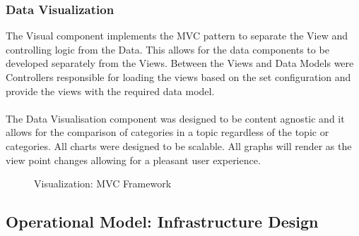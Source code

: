 \documentclass[12pt]{article} %
\begin{document}
	\subsubsection{Data Visualization}
	
	The Visual component implements the MVC pattern to separate the View and controlling logic from the Data. This allows for the data components to be developed separately from the Views. Between the Views and Data Models were Controllers responsible for  loading the views based on the set configuration and provide the views with the required data model.\\
	\\
	The Data Visualisation component was designed to be content agnostic and it allows for the comparison of categories in a topic regardless of the topic or categories.
	All charts were designed to be scalable. All graphs will render as the view point changes allowing for a pleasant user experience.
	
	
		\begin{figure}[H] %
			\caption{Visualization: MVC Framework}
			\label{fig:speciation}
		\end{figure}
	
	\subsection{Operational Model: Infrastructure Design}
	
\end{document}
